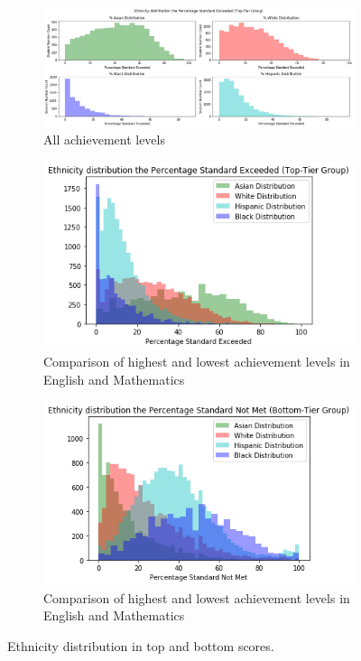\documentclass[11pt]{article}
\begin{document}
\begin{figure}[h!]
\centering
\begin{subfigure}[h]{0.9\textwidth}
         \centering
         \includegraphics[width=\textwidth]{output_113_0.png}
         \caption{All achievement levels}
         \label{fig:Ethnicity_distribution_top_4}
\end{subfigure}
\hfill
\begin{subfigure}{0.45\textwidth}
         \centering
         \includegraphics[width=\textwidth]{output_115_0.png}
         \caption{Comparison of highest and lowest achievement levels 
in English and Mathematics}
         \label{fig:Ethnicity_distribution_top_1}
\end{subfigure}
\hfill
\begin{subfigure}{0.45\textwidth}
         \centering
         \includegraphics[width=\textwidth]{output_117_0.png}
         \caption{Comparison of highest and lowest achievement levels 
in English and Mathematics}
         \label{fig:Ethnicity_distribution_bottom_1}
\end{subfigure}
\caption{Ethnicity distribution in top and bottom scores.}
\label{fig:Ethnicity_distribution}
\end{figure}
\end{document}
